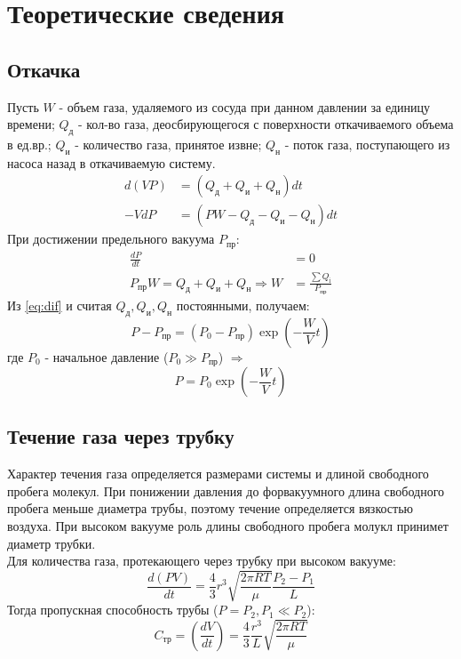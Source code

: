 \section*{Теоретические сведения}
\subsection*{Откачка}
Пусть $W$ - объем газа, удаляемого из сосуда при данном давлении за 
единицу времени; $Q_{\text{д}}$ - кол-во газа, деосбирующегося с поверхности 
откачиваемого объема в ед.вр.; $Q_{\text{и}}$ - количество газа, принятое
извне; $Q_{\text{н}}$ - поток газа, поступающего из насоса назад в
откачиваемую систему. 
\begin{align}
    d(VP) &= (Q_{\text{д}} + Q_{\text{и}} + Q_{\text{н}}) dt \label{eq:dif}\\
    -VdP &= (PW - Q_{\text{д}} - Q_{\text{и}} - Q_{\text{н}}) dt
\end{align}
При достижении предельного вакуума $P_{\text{пр}}$:
\begin{align}
    \frac{dP}{dt} &= 0\\ 
    P_{\text{пр}}W = Q_{\text{д}} + Q_{\text{и}} + Q_{\text{н}} \Rightarrow W &= \frac{\sum Q_{\text{i}}}{P_{\text{пр}}}
\end{align}
Из \ref{eq:dif} и считая $Q_{\text{д}}, Q_{\text{и}}, Q_{\text{н}}$
постоянными, получаем:
\begin{equation}
P - P_{\text{пр}} = (P_0 - P_{\text{пр}})\exp{\left (-\frac{W}{V}t\right )}
\end{equation}
где $P_0$ - начальное давление ($P_0 \gg P_{\text{пр}}$) $\Rightarrow$
\begin{equation}
    P = P_0\exp(-\frac{W}{V}t)
\end{equation}

\subsection*{Течение газа через трубку}
Характер течения газа определяется размерами системы и длиной свободного 
пробега молекул. При понижении давления до форвакуумного длина свободного 
пробега меньше диаметра трубы, поэтому течение определяется вязкостью воздуха. 
При высоком вакууме роль длины свободного пробега молукл принимет диаметр
трубки. \\\indent 
Для количества газа, протекающего через трубку при высоком вакууме:
\begin{equation}
    \frac{d(PV)}{dt} = \frac{4}{3}r^3 \sqrt{\frac{2\pi RT}{\mu}} \frac{P_2 - P_1}{L}
\end{equation}
Тогда пропускная способность трубы ($P = P_2, P_1 \ll P_2$):
\begin{equation}
    C_{\text{тр}} = \left (\frac{dV}{dt} \right ) = \frac{4}{3}\frac{r^3}{L} \sqrt{\frac{2\pi RT}{\mu}}  
\end{equation}




